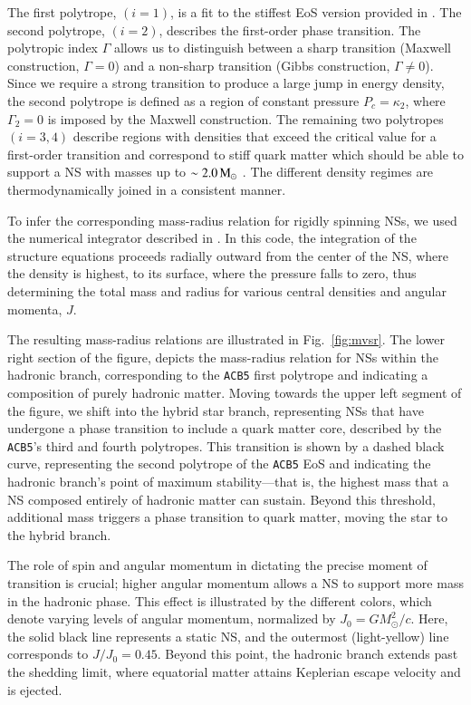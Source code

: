 \documentclass[main.tex]{subfiles}
\begin{document}
        The first polytrope, $(i=1)$, is a fit to the stiffest EoS version provided in \cite{Hebeler:2013apj}. The second polytrope, $(i=2)$, describes the first-order phase transition. The polytropic index $\Gamma$ allows us to distinguish between a sharp transition (Maxwell construction, $\Gamma = 0$) and a non-sharp transition (Gibbs construction, $\Gamma \neq 0$). Since we require a strong transition to produce a large jump in energy density, the second polytrope is defined as a region of constant pressure $P_c = \kappa_2$, where $\Gamma_2 = 0$ is imposed by the Maxwell construction. The remaining two polytropes $(i = 3,4)$ describe regions with densities that exceed the critical value for a first-order transition and correspond to stiff quark matter which should be able to support a NS with masses up to $\sim 2.0\mathrm{\,M_\odot}$ \citep[e.g.,][]{2020NatAs...4...72C}.
        The different density regimes are thermodynamically joined in a consistent manner. 
        
        To infer the corresponding mass-radius relation for rigidly spinning NSs, we used the numerical integrator described in \cite{Alvarez-Castillo:2019apz}. 
        In this code, the integration of the structure equations proceeds radially outward from the center of the NS, where the density is highest, to its surface, where the pressure falls to zero, thus determining the total mass and radius for various central densities and angular momenta, $J$. 
        
        The resulting mass-radius relations are illustrated in Fig.~\ref{fig:mvsr}. 
        The lower right section of the figure, depicts the mass-radius relation for NSs within the hadronic branch, corresponding to the \texttt{ACB5} first polytrope and indicating a composition of purely hadronic matter. Moving towards the upper left segment of the figure, we shift into the hybrid star branch, representing NSs that have undergone a phase transition to include a quark matter core, described by the \texttt{ACB5}'s third and fourth polytropes. This transition is shown by a dashed black curve, representing the second polytrope of the \texttt{ACB5} EoS and indicating the hadronic branch's point of maximum stability---that is, the highest mass that a NS composed entirely of hadronic matter can sustain. Beyond this threshold, additional mass triggers a phase transition to quark matter, moving the star to the hybrid branch.
        
        The role of spin and angular momentum in dictating the precise moment of transition is crucial; higher angular momentum allows a NS to support more mass in the hadronic phase. This effect is illustrated by the 
        different colors, which denote varying levels of angular momentum, normalized by $J_0 = \displaystyle GM_\odot^2/c$. Here, the solid black line represents a static NS, and the outermost (light-yellow) line corresponds to $J/J_0 = 0.45$. Beyond this point, the hadronic branch extends past the shedding limit, where equatorial matter attains Keplerian escape velocity and is ejected.
        
\end{document}
